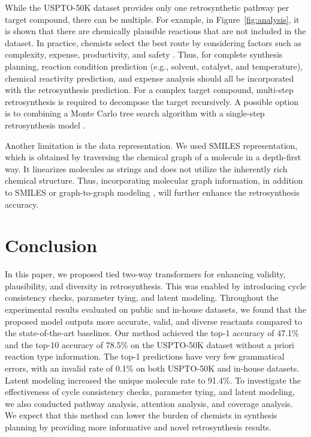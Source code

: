 \documentclass[journal=jacsat,manuscript=article]{achemso}
\begin{document}
	While the USPTO-50K dataset provides only one retrosynthetic pathway per target compound, there can be multiple. For example, in Figure~\ref{fig:analysis}, it is shown that there are chemically plausible reactions that are not included in the dataset. In practice, chemists select the best route by considering factors such as complexity, expense, productivity, and safety \cite{zheng2019predicting}. Thus, for complete synthesis planning, reaction condition prediction (e.g., solvent, catalyst, and temperature), chemical reactivity prediction, and expense analysis should all be incorporated with the retrosynthesis prediction. For a complex target compound, multi-step retrosynthesis is required to decompose the target recursively. A possible option is to combining a Monte Carlo tree search algorithm with a single-step retrosynthesis model \cite{lin2020automatic}.
	
	Another limitation is the data representation. We used SMILES representation, which is obtained by traversing the chemical graph of a molecule in a depth-first way. It linearizes molecules as strings and does not utilize the inherently rich chemical structure. Thus, incorporating molecular graph information, in addition to SMILES \cite{maziarka2020molecule} or graph-to-graph modeling \cite{shi2020graph}, will further enhance the retrosynthesis accuracy.

	
	\section{Conclusion}
	
	In this paper, we proposed tied two-way transformers for enhancing validity, plausibility, and diversity in retrosynthesis. This was enabled by introducing cycle consistency checks, parameter tying, and latent modeling. Throughout the experimental results evaluated on public and in-house datasets, we found that the proposed model outputs more accurate, valid, and diverse reactants compared to the state-of-the-art baselines. Our method achieved the top-1 accuracy of 47.1\% and the top-10 accuracy of 78.5\% on the USPTO-50K dataset without a priori reaction type information. The top-1 predictions have very few grammatical errors, with an invalid rate of 0.1\% on both USPTO-50K and in-house datasets. Latent modeling increased the unique molecule rate to 91.4\%. To investigate the effectiveness of cycle consistency checks, parameter tying, and latent modeling, we also conducted pathway analysis, attention analysis, and coverage analysis. We expect that this method can lower the burden of chemists in synthesis planning by providing more informative and novel retrosynthesis results.
	
\end{document}
